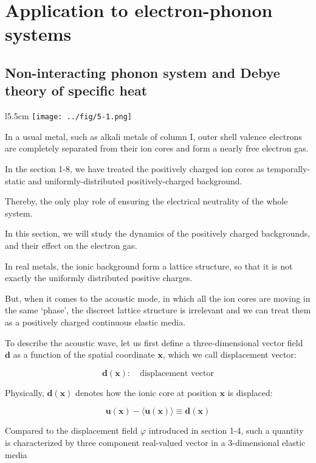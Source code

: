 \chapter{Application to electron-phonon systems}

\section{Non-interacting phonon system and Debye theory of specific heat}

\begin{wrapfigure}{l}{5.5cm}
\texttt{[image: ../fig/5-1.png]}
\end{wrapfigure}

In a usual metal, such as alkali metals of column I, outer shell valence electrons are completely separated from their ion cores and form a nearly free electron gas.

In the section 1-8, we have treated the positively charged ion cores as temporally-static and uniformly-distributed positively-charged background.

Thereby, the only play role of ensuring the electrical neutrality of the whole system.

In this section, we will study the dynamics of the positively charged backgrounds, and their effect on the electron gas.

In real metals, the ionic background form a lattice structure, so that it is not exactly the uniformly distributed positive charges.

But, when it comes to the acoustic mode, in which all the ion cores are moving in the same `phase', the discreet lattice structure is irrelevant and we can treat them as a positively charged continuous elastic media.

To describe the acoustic wave, let us first define a three-dimensional vector field $\bm d$ as a function of the spatial coordinate $\bm x$, which we call displacement vector:

\[\bm{d}(\bm{x}):\quad\text{displacement vector} \]

Physically, $\bm{d(x)}$ denotes how the ionic core at position $\bm x$ is displaced:

\[\bm{u(x) - \langle u(x)\rangle \equiv d(x)} \]

Compared to the displacement field $\varphi$ introduced in section 1-4, such a quantity is characterized by three component real-valued vector in a $3$-dimensional elastic media

